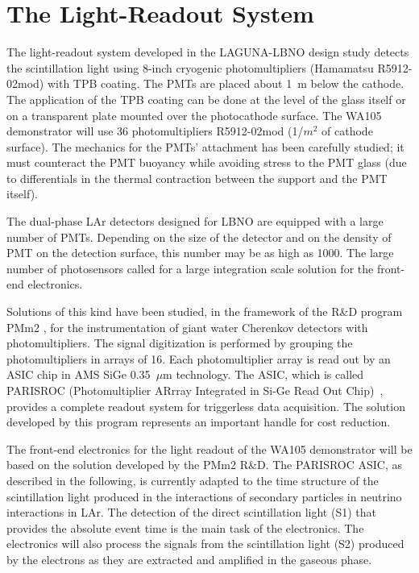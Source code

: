 \section{The Light-Readout System} 
\label{sec:detectors-fd-alt-light}

The light-readout system developed in the LAGUNA-LBNO design study detects the scintillation light using 8-inch cryogenic
photomultipliers (Hamamatsu R5912-02mod) with TPB coating. The PMTs are placed about 1~m below the cathode.   
The application of the TPB coating can be done at the level of the glass itself or on a transparent plate mounted over the photocathode surface. The WA105
demonstrator will use 36 photomultipliers R5912-02mod (1/$m^2$ of cathode surface). The mechanics for the PMTs' attachment   has been
carefully studied; it must counteract the PMT buoyancy while avoiding stress to the PMT glass (due to differentials  in the thermal contraction between the support and the PMT itself).

The dual-phase LAr detectors designed for LBNO are equipped with a large number of PMTs. Depending on the size of the detector and on the density of PMT on the detection surface,  this number may be as high as 1000. The large number of photosensors called for a large integration scale solution for the front-end electronics.

Solutions of this kind have been studied, in the framework of the R\&D program PMm2 \cite{PMM2-1,  PMM2-2}, for the instrumentation of giant water Cherenkov detectors with photomultipliers. The signal digitization is performed by grouping the photomultipliers in arrays of 16. Each
photomultiplier array is read out by an ASIC chip in AMS SiGe 0.35~$\mu$m technology. The ASIC, which is called PARISROC
(Photomultiplier ARrray Integrated in Si-Ge Read Out Chip)~\cite{Parisroc}, provides a complete readout system for triggerless data
acquisition. The solution developed by this program represents an important handle for cost reduction.



The front-end electronics for the light readout of the WA105 demonstrator will be based on the solution developed by the PMm2
R\&D. The PARISROC ASIC, as described in the following, is currently adapted to the time structure of the scintillation light produced in
the interactions of secondary particles in neutrino interactions in LAr. The detection of the direct scintillation light (S1) that provides the absolute event time
 is the main task of the electronics.  The electronics will also process the signals from the scintillation light (S2) produced by the electrons as they are extracted and amplified in the gaseous phase. 


